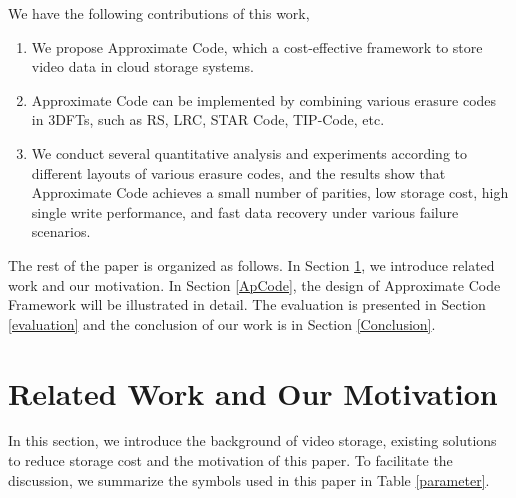 \documentclass[sigconf]{acmart}
\begin{document}
We have the following contributions of this work,
\begin{enumerate}
\item We propose Approximate Code, which a cost-effective framework to store video data in cloud storage systems.
\item Approximate Code can be implemented by combining various erasure codes in 3DFTs, such as RS, LRC, STAR Code, TIP-Code, etc.
\item We conduct several quantitative analysis and experiments according to different layouts of various erasure codes, and the results show that Approximate Code achieves a small number of parities, low storage cost, high single write performance, and fast data recovery under various failure scenarios.
\end{enumerate}

The rest of the paper is organized as follows. In Section \ref{RelatedWork}, we introduce related work and our motivation.
In Section \ref{ApCode}, the design of Approximate Code Framework will be illustrated in detail.
The evaluation is presented in Section \ref{evaluation} and the conclusion of our work is in Section \ref{Conclusion}.

\section{Related Work and Our Motivation}\label{RelatedWork}
In this section, we introduce the background of video storage, existing solutions to reduce storage cost and the motivation of this paper.
To facilitate the discussion, we summarize the symbols used in this paper in Table \ref{parameter}.
\end{document}
